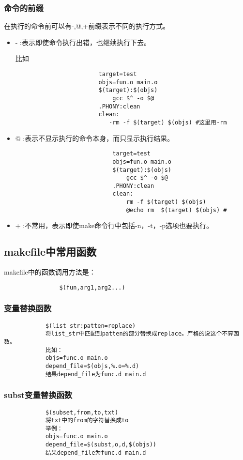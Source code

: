 \documentclass{article}
\begin{document}
\begin{CJK}{UTF8}{gbsn}
	\subsubsection{命令的前缀}
		在执行的命令前可以有-,@,+前缀表示不同的执行方式。
		\begin{itemize}
				\item - :表示即使命令执行出错，也继续执行下去。
					\par 比如
					\begin{verbatim}
						target=test
						objs=fun.o main.o
						$(target):$(objs)
						    gcc $^ -o $@
						.PHONY:clean
						clean:
						   -rm -f $(target) $(objs) #这里用-rm
					\end{verbatim}		
				\item @ :表示不显示执行的命令本身，而只显示执行结果。
					\begin{verbatim}
							target=test
							objs=fun.o main.o
							$(target):$(objs)
							    gcc $^ -o $@
							.PHONY:clean
							clean:
							    rm -f $(target) $(objs)
							    @echo rm  $(target) $(objs) #
					\end{verbatim}				
				\item + :不常用，表示即使make命令行中包括-n，-t，-p选项也要执行。
		\end{itemize}

	\subsection{makefile中常用函数}	
		makefile中的函数调用方法是：
			\begin{verbatim}
				$(fun,arg1,arg2...)
			\end{verbatim}
		\subsubsection{变量替换函数}
		\begin{verbatim}
			$(list_str:patten=replace)
			将list_str中匹配到patten的部分替换成replace。严格的说这个不算函数。
			比如：
			objs=func.o main.o
			depend_file=$(objs,%.o=%.d)
			结果depend_file为func.d main.d
		\end{verbatim}
		\subsubsection{subst变量替换函数}
		\begin{verbatim}
			$(subset,from,to,txt)
			将txt中的from的字符替换成to
			举例：
			objs=func.o main.o
			depend_file=$(subst,o,d,$(objs))
			结果depend_file为func.d main.d
		\end{verbatim}

\end{CJK}
\end{document}
